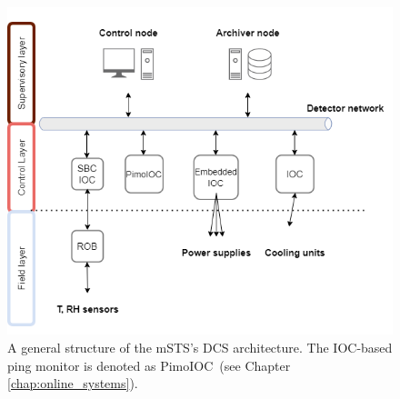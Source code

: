 \begin{figure}[!h]
\centering
\includegraphics[width=0.65\columnwidth]{Chapter6/DCS/images/mcbmpng (2).png}
\caption{A general structure of the \gls{mSTS}'s \gls{DCS} architecture. The IOC-based ping monitor is denoted as PimoIOC~(see Chapter \ref{chap:online_systems}).}
\label{fig_mstsarch}
\end{figure}

